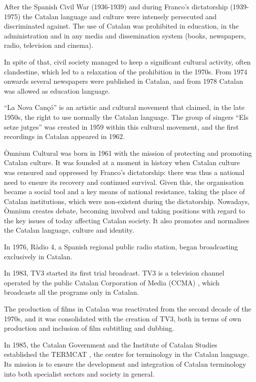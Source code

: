 \begin{multicols}{2}
After the Spanish Civil War (1936-1939) and during Franco’s dictatorship (1939-1975) the Catalan language and culture were intensely persecuted and discriminated against. The use of Catalan was prohibited in education, in the administration and in any media and dissemination system (books, newspapers, radio, television and cinema).

In spite of that, civil society managed to keep a significant cultural activity, often clandestine, which led to a relaxation of the prohibition in the 1970s. From 1974 onwards several newspapers were published in Catalan, and from 1978 Catalan was allowed as education language.

 “La Nova Cançó” is an artistic and cultural movement that claimed, in the late 1950s, the right to use normally the Catalan language. The group of singers “Els setze jutges” was created in 1959 within this cultural movement, and the first recordings in Catalan appeared in 1962.

Òmnium Cultural \cite{CAT-omniumcultural} was born in 1961 with the mission of protecting and promoting Catalan culture. It was founded at a moment in history when Catalan culture was censured and oppressed by Franco’s dictatorship: there was thus a national need to ensure its recovery and continued survival. Given this, the organisation became a social tool and a key means of national resistance, taking the place of Catalan institutions, which were non-existent during the dictatorship. Nowadays, Òmnium creates debate, becoming involved and taking positions with regard to the key issues of today affecting Catalan society. It also promotes and normalises the Catalan language, culture and identity.

In 1976, Ràdio 4, a Spanish regional public radio station, began broadcasting exclusively in Catalan.

In 1983, TV3 started its first trial broadcast. TV3 is a television channel operated by the public Catalan Corporation of Media (CCMA) \cite{CAT-CCMA}, which broadcasts all the programs only in Catalan.

The production of films in Catalan was reactivated from the second decade of the 1970s, and it was consolidated with the creation of TV3, both in terms of own production and inclusion of film subtitling and dubbing.

In 1985, the Catalan Government and the Institute of Catalan Studies established the TERMCAT \cite{CAT-TERMCAT}, the centre for terminology in the Catalan language. Its mission is to ensure the development and integration of Catalan terminology into both specialist sectors and society in general.


\end{multicols}
